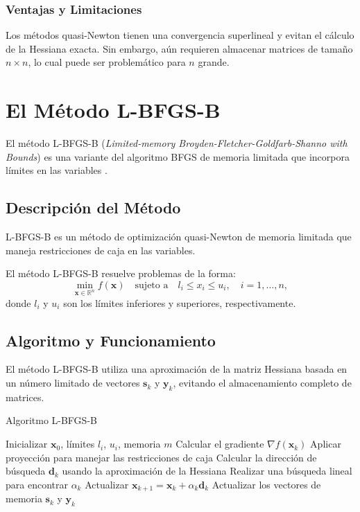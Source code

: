 \subsubsection{Ventajas y Limitaciones}

Los métodos quasi-Newton tienen una convergencia superlineal y evitan el cálculo de la Hessiana exacta. Sin embargo, aún requieren almacenar matrices de tamaño $n \times n$, lo cual puede ser problemático para $n$ grande.

\section{El Método L-BFGS-B}

El método L-BFGS-B (\textit{Limited-memory Broyden-Fletcher-Goldfarb-Shanno with Bounds}) es una variante del algoritmo BFGS de memoria limitada que incorpora límites en las variables \cite{byrd1995limited}.

\subsection{Descripción del Método}

L-BFGS-B es un método de optimización quasi-Newton de memoria limitada que maneja restricciones de caja en las variables.

\begin{definicion}
\label{def:lbfgsb}
El método L-BFGS-B resuelve problemas de la forma:
\begin{equation}
\min_{\mathbf{x} \in \mathbb{R}^n} f(\mathbf{x}) \quad \text{sujeto a} \quad l_i \leq x_i \leq u_i, \quad i = 1, \dots, n,
\end{equation}
donde $l_i$ y $u_i$ son los límites inferiores y superiores, respectivamente.
\end{definicion}

\subsection{Algoritmo y Funcionamiento}

El método L-BFGS-B utiliza una aproximación de la matriz Hessiana basada en un número limitado de vectores $\mathbf{s}_k$ y $\mathbf{y}_k$, evitando el almacenamiento completo de matrices.

\begin{algorithm}[H]
\caption{Algoritmo L-BFGS-B}
\begin{algorithmic}[1]
\STATE Inicializar $\mathbf{x}_0$, límites $l_i$, $u_i$, memoria $m$
    \STATE Calcular el gradiente $\nabla f(\mathbf{x}_k)$
    \STATE Aplicar proyección para manejar las restricciones de caja
    \STATE Calcular la dirección de búsqueda $\mathbf{d}_k$ usando la aproximación de la Hessiana
    \STATE Realizar una búsqueda lineal para encontrar $\alpha_k$
    \STATE Actualizar $\mathbf{x}_{k+1} = \mathbf{x}_k + \alpha_k \mathbf{d}_k$
    \STATE Actualizar los vectores de memoria $\mathbf{s}_k$ y $\mathbf{y}_k$
\ENDFOR
\end{algorithmic}
\end{algorithm}

